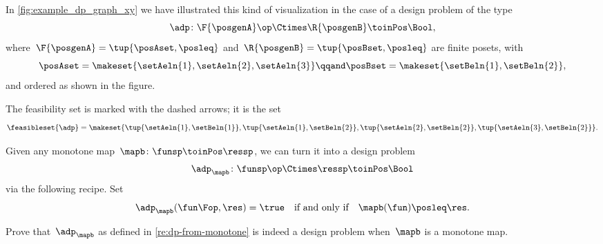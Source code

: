\begin{marginfigure}
    \centering
    \caption{}
    \label{fig:example_dp_graph_xy}
\end{marginfigure}

\begin{example}
    \label{exa:visualize-dp}
    In \cref{fig:example_dp_graph_xy} we have illustrated this kind of visualization in the case of a design problem of the type
    \begin{equation}
        \adp \colon \F{\posgenA} \op \Ctimes  \R{\posgenB} \toinPos \Bool,
    \end{equation}
    where~$\F{\posgenA} = \tup{\posAset, \posleq}$ and~$ \R{\posgenB} = \tup{\posBset, \posleq}$ are finite posets, with
    \begin{equation}
        \posAset = \makeset{ \setAeln{1}, \setAeln{2}, \setAeln{3} }
        \qqand
        \posBset =  \makeset{ \setBeln{1}, \setBeln{2}},
    \end{equation}
    and ordered as shown in the figure.

    The feasibility set is marked with the dashed arrows; it is the set
    \begin{equation}
        \feasibleset{\adp} = \makeset{\tup{\setAeln{1}, \setBeln{1}}, \tup{\setAeln{1}, \setBeln{2}}, \tup{\setAeln{2}, \setBeln{2}}, \tup{\setAeln{3}, \setBeln{2}} }.
    \end{equation}
\end{example}

\begin{remark}
    \label{re:dp-from-monotone}
    Given any monotone map~$\mapb\colon \funsp \toinPos \ressp$, we can turn it into a design problem
    \begin{equation}
        \adp_\mapb \colon \funsp\op \Ctimes \ressp \toinPos \Bool
    \end{equation}
    via the following recipe.
    Set
    \begin{equation}
        \adp_\mapb (\fun\Fop, \res) = \true \quad \text{if and only if} \quad \mapb(\fun) \posleq \res.
    \end{equation}
\end{remark}

\begin{exercise}
    \label{ex:adp-monotone}
    Prove that~$\adp_\mapb$ as defined in \cref{re:dp-from-monotone} is indeed a design problem when~$\mapb$ is a monotone map.
\end{exercise}
%
\begin{solution}
    \missingsolution
\end{solution}

